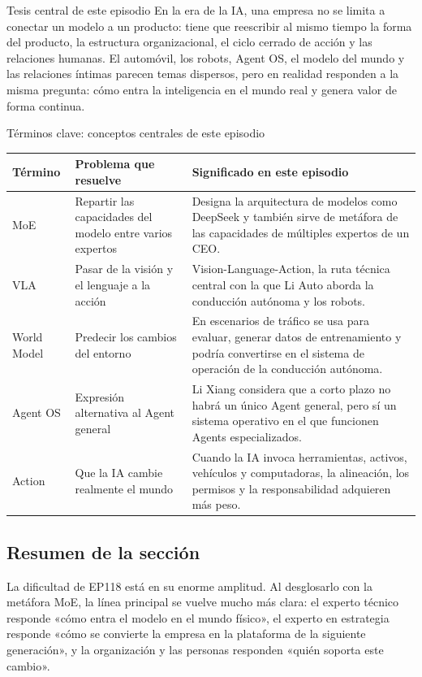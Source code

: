 \documentclass[a4paper]{article}
\begin{document}
\begin{importantbox}{Tesis central de este episodio}
En la era de la IA, una empresa no se limita a conectar un modelo a un producto: tiene que reescribir al mismo tiempo la forma del producto, la estructura organizacional, el ciclo cerrado de acción y las relaciones humanas. El automóvil, los robots, Agent OS, el modelo del mundo y las relaciones íntimas parecen temas dispersos, pero en realidad responden a la misma pregunta: cómo entra la inteligencia en el mundo real y genera valor de forma continua.
\end{importantbox}

\begin{knowledgebox}{Términos clave: conceptos centrales de este episodio}
\begin{tabularx}{\textwidth}{p{}p{}X}
\toprule
Término & Problema que resuelve & Significado en este episodio \\
\midrule
MoE & Repartir las capacidades del modelo entre varios expertos & Designa la arquitectura de modelos como DeepSeek y también sirve de metáfora de las capacidades de múltiples expertos de un CEO. \\
VLA & Pasar de la visión y el lenguaje a la acción & Vision-Language-Action, la ruta técnica central con la que Li Auto aborda la conducción autónoma y los robots. \\
World Model & Predecir los cambios del entorno & En escenarios de tráfico se usa para evaluar, generar datos de entrenamiento y podría convertirse en el sistema de operación de la conducción autónoma. \\
Agent OS & Expresión alternativa al Agent general & Li Xiang considera que a corto plazo no habrá un único Agent general, pero sí un sistema operativo en el que funcionen Agents especializados. \\
Action & Que la IA cambie realmente el mundo & Cuando la IA invoca herramientas, activos, vehículos y computadoras, la alineación, los permisos y la responsabilidad adquieren más peso. \\
\bottomrule
\end{tabularx}
\end{knowledgebox}

\subsection{Resumen de la sección}

La dificultad de EP118 está en su enorme amplitud. Al desglosarlo con la metáfora MoE, la línea principal se vuelve mucho más clara: el experto técnico responde «cómo entra el modelo en el mundo físico», el experto en estrategia responde «cómo se convierte la empresa en la plataforma de la siguiente generación», y la organización y las personas responden «quién soporta este cambio».
\end{document}
